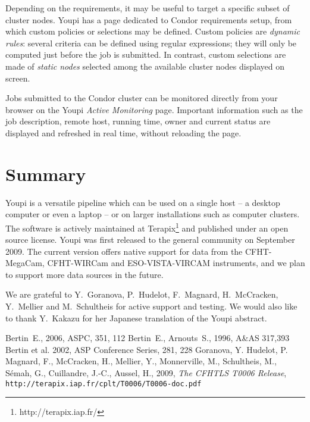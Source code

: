 \documentclass[11pt,twoside]{article}  %
\begin{document}
Depending on the requirements, it may be useful to target a specific subset of cluster 
nodes. Youpi has a page dedicated to Condor requirements setup, from which custom policies or
selections may be defined. Custom policies are \emph{dynamic rules}: several criteria can be 
defined using regular expressions; they will only be computed just before the job is
submitted. In contrast, custom selections are made of \emph{static nodes} 
selected among the available cluster nodes displayed on screen.

Jobs submitted to the Condor cluster can be monitored directly from your browser on the
Youpi \emph{Active Monitoring} page. Important information such as the job 
description, remote host, running time, owner and current status are displayed and refreshed 
in real time, without reloading the page.

\section{Summary}

Youpi is a versatile pipeline which can be used on a single host -- a desktop computer or even 
a laptop -- or on larger installations such as computer clusters. The software is actively maintained
at Terapix\footnote{http://terapix.iap.fr/} and published under an 
open source license. Youpi was first released to the general community on September 2009.
The current version offers
native support for data from the CFHT-MegaCam, CFHT-WIRCam and ESO-VISTA-VIRCAM instruments,
and we plan to support more data sources in the future. 

\acknowledgments

We are grateful to Y.\ Goranova, P.\ Hudelot, F.\ Magnard, H.\ McCracken, Y.\ Mellier and 
M.\ Schultheis for active support and testing. We would also like to thank Y.\ Kakazu for her Japanese
translation of the Youpi abstract.

\begin{references}

 Bertin~E., 2006, ASPC, 351, 112
 Bertin~E., Arnouts~S., 1996, A\&AS 317,393
 Bertin et al. 2002, ASP Conference Series, 281, 228
 Goranova, Y. Hudelot, P. Magnard, F., McCracken, H.,
 Mellier, Y., Monnerville, M., Schultheis, M., S\'emah, G., Cuillandre, J.-C., Aussel, H., 2009, {\it The CFHTLS T0006 Release},
 {\tt http://terapix.iap.fr/cplt/T0006/T0006-doc.pdf}\\
    
\end{references}

\end{document}
